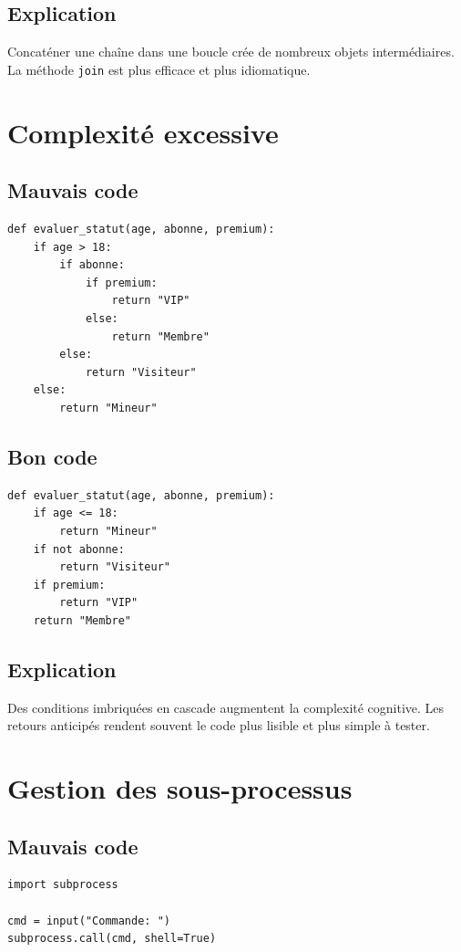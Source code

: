 \documentclass[a4paper,11pt]{report}
\begin{document}
\section{Explication}
Concaténer une chaîne dans une boucle crée de nombreux objets intermédiaires.
La méthode \texttt{join} est plus efficace et plus idiomatique.

\chapter{Complexité excessive}

\section{Mauvais code}
\begin{lstlisting}
def evaluer_statut(age, abonne, premium):
    if age > 18:
        if abonne:
            if premium:
                return "VIP"
            else:
                return "Membre"
        else:
            return "Visiteur"
    else:
        return "Mineur"
\end{lstlisting}

\section{Bon code}
\begin{lstlisting}
def evaluer_statut(age, abonne, premium):
    if age <= 18:
        return "Mineur"
    if not abonne:
        return "Visiteur"
    if premium:
        return "VIP"
    return "Membre"
\end{lstlisting}

\section{Explication}
Des conditions imbriquées en cascade augmentent la complexité cognitive.
Les retours anticipés rendent souvent le code plus lisible et plus simple à tester.

\chapter{Gestion des sous-processus}

\section{Mauvais code}
\begin{lstlisting}
import subprocess

cmd = input("Commande: ")
subprocess.call(cmd, shell=True)
\end{lstlisting}
\end{document}
